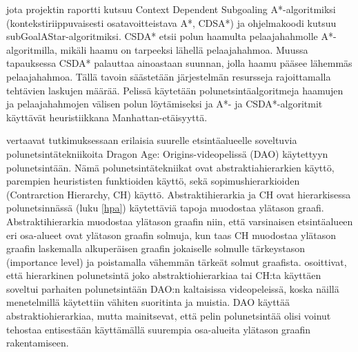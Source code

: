 jota projektin raportti kutsuu Context Dependent Subgoaling A*-algoritmiksi
(kontekstiriippuvaisesti osatavoitteistava A*, CDSA*) ja ohjelmakoodi kutsuu 
subGoalAStar-algoritmiksi. CSDA* etsii polun haamulta pelaajahahmolle 
A*-algoritmilla, mikäli haamu on tarpeeksi lähellä pelaajahahmoa. Muussa 
tapauksessa CSDA* palauttaa ainoastaan suunnan, jolla haamu pääsee lähemmäs 
pelaajahahmoa. Tällä tavoin säästetään järjestelmän resursseja rajoittamalla 
tehtävien laskujen määrää. Pelissä käytetään polunetsintäalgoritmeja 
haamujen ja pelaajahahmojen välisen polun löytämiseksi ja A*- ja 
CSDA*-algoritmit käyttävät heuristiikkana Manhattan-etäisyyttä. \par
	\textcite{SturtevantDAO} vertaavat tutkimuksessaan erilaisia 
suurelle etsintäalueelle soveltuvia polunetsintätekniikoita Dragon Age: 
Origins-videopelissä (DAO) käytettyyn polunetsintään. Nämä 
polunetsintätekniikat ovat abstraktiahierarkien käyttö, parempien 
heurististen funktioiden käyttö, sekä sopimushierarkioiden (Contrarction 
Hierarchy, CH) käyttö. Abstraktihierarkia ja CH ovat hierarkisessa 
polunetsinnässä (luku \ref{hpa}) käytettäviä tapoja muodostaa ylätason 
graafi. Abstraktihierarkia muodostaa ylätason graafin niin, että 
varsinaisen etsintäalueen eri osa-alueet ovat ylätason graafin solmuja, kun 
taas CH muodostaa ylätason graafin laskemalla alkuperäisen graafin jokaiselle 
solmulle tärkeystason (importance level) ja poistamalla vähemmän tärkeät 
solmut graafista. \textcite{SturtevantDAO} osoittivat, että hierarkinen 
polunetsintä joko abstraktiohierarkiaa tai CH:ta käyttäen soveltui parhaiten 
polunetsintään DAO:n kaltaisissa videopeleissä, koska näillä menetelmillä 
käytettiin vähiten suoritinta ja muistia. DAO käyttää abstraktiohierarkiaa, 
mutta \textcite{SturtevantDAO} mainitsevat, että pelin polunetsintää olisi 
voinut tehostaa entisestään käyttämällä suurempia osa-alueita ylätason 
graafin rakentamiseen.

